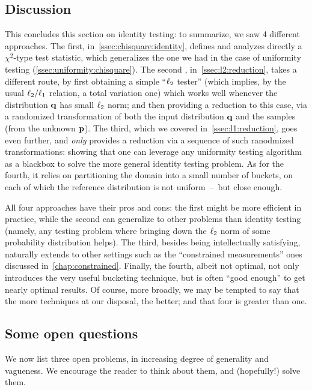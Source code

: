 \subsection{Discussion}
This concludes this section on identity testing: to summarize, we saw 4 different approaches. The first, in~\cref{ssec:chisquare:identity}, defines and analyzes directly a $\chi^2$-type test statistic, which generalizes the one we had in the case of uniformity testing (\cref{ssec:uniformity:chisquare}). The second , in~\cref{ssec:l2:reduction}, takes a different route, by first obtaining a simple ``$\lp[2]$ tester'' (which implies, by the usual $\lp[2]/\lp[1]$ relation, a total variation one) which works well whenever the distribution $\q$ has small $\lp[2]$ norm; and then providing a reduction to this case, via a randomized transformation of both the input distribution $\q$ and the samples (from the unknown $\p$). The third, which we covered in~\cref{ssec:l1:reduction}, goes even further, and \emph{only} provides a reduction via a sequence of such ranodmized transformations: showing that one can leverage any uniformity testing algorithm as a blackbox to solve the more general identity testing problem. As for the fourth, it relies on partitioning the domain into a small number of buckets, on each of which the reference distribution is not uniform~--~but close enough.

All four approaches have their pros and cons: the first might be more efficient in practice, while the second can generalize to other problems than identity testing (namely, any testing problem where bringing down the $\lp[2]$ norm of some probability distribution helps). The third, besides being intellectually satisfying, naturally extends to other settings such as the ``constrained measurements'' ones discussed in~\cref{chap:constrained}. Finally, the fourth, albeit not optimal, not only introduces the very useful bucketing technique, but is often ``good enough'' to get nearly optimal results. Of course, more broadly, we may be tempted to say that the more techniques at our disposal, the better; and that four is greater than one.

\subsection{Some open questions}
We now list three open problems, in increasing degree of generality and vagueness. We encourage the reader to think about them, and (hopefully!) solve them.

